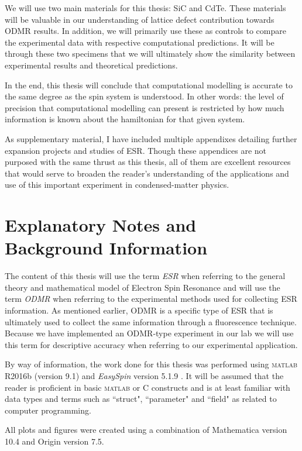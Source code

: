 \documentclass[oneside, astronomy, noacknowlegments]{BYUPhys}
\begin{document}
We will use two main materials for this thesis: SiC and CdTe. These materials will be valuable in our understanding of lattice defect contribution towards ODMR results. In addition, we will primarily use these as controls to compare the experimental data with respective computational predictions. It will be through these two specimens that we will ultimately show the similarity between experimental results and theoretical predictions.

In the end, this thesis will conclude that computational modelling is accurate to the same degree as the spin system is understood. In other words: the level of precision that computational modelling can present is restricted by how much information is known about the hamiltonian for that given system.

As supplementary material, I have included multiple appendixes detailing further expansion projects and studies of ESR. Though these appendices are not purposed with the same thrust as this thesis, all of them are excellent resources that would serve to broaden the reader's understanding of the applications and use of this important experiment in condensed-matter physics.

\section{Explanatory Notes and Background Information}

The content of this thesis will use the term \textit{ESR} when referring to the general theory and mathematical model of Electron Spin Resonance and will use the term \textit{ODMR} when referring to the experimental methods used for collecting ESR information. As mentioned earlier, ODMR is a specific type of ESR that is ultimately used to collect the same information through a fluorescence technique. Because we have implemented an ODMR-type experiment in our lab we will use this term for descriptive accuracy when referring to our experimental application.

By way of information, the work done for this thesis was performed using \textsc{matlab} R2016b (version 9.1) and \textit{EasySpin} version 5.1.9 . It will be assumed that the reader is proficient in basic \textsc{matlab} or C constructs and is at least familiar with data types and terms such as ``struct", ``parameter" and ``field" as related to computer programming.

All plots and figures were created using a combination of Mathematica version 10.4 and Origin version 7.5.
\end{document}
